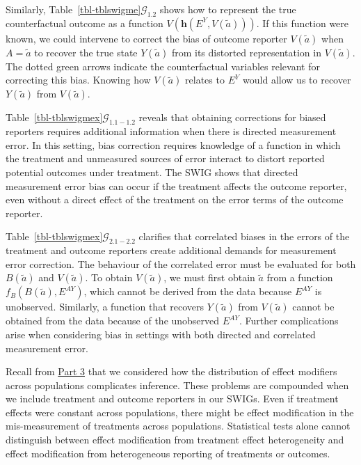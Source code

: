 \documentclass[
  single column]{article}
\begin{document}
Similarly, Table~\ref{tbl-tblswigme}\(\mathcal{G}_{1.2}\) shows how to
represent the true counterfactual outcome as a function
\(V(\mathbf{h}(E^Y, V(\tilde{a})))\). If this function were known, we
could intervene to correct the bias of outcome reporter \(V(\tilde{a})\)
when \(A = \tilde{a}\) to recover the true state \(Y(\tilde{a})\) from
its distorted representation in \(V(\tilde{a})\). The dotted green
arrows indicate the counterfactual variables relevant for correcting
this bias. Knowing how \(V(\tilde{a})\) relates to \(E^Y\) would allow
us to recover \(Y(\tilde{a})\) from \(V(\tilde{a})\).

Table~\ref{tbl-tblswigmex}\(\mathcal{G}_{1.1-1.2}\) reveals that
obtaining corrections for biased reporters requires additional
information when there is directed measurement error. In this setting,
bias correction requires knowledge of a function in which the treatment
and unmeasured sources of error interact to distort reported potential
outcomes under treatment. The SWIG shows that directed measurement error
bias can occur if the treatment affects the outcome reporter, even
without a direct effect of the treatment on the error terms of the
outcome reporter.

Table~\ref{tbl-tblswigmex}\(\mathcal{G}_{2.1-2.2}\) clarifies that
correlated biases in the errors of the treatment and outcome reporters
create additional demands for measurement error correction. The
behaviour of the correlated error must be evaluated for both
\(B(\tilde{a})\) and \(V(\tilde{a})\). To obtain \(V(\tilde{a})\), we
must first obtain \(\tilde{a}\) from a function
\(f_{B}(B(\tilde{a}), E^{AY})\), which cannot be derived from the data
because \(E^{AY}\) is unobserved. Similarly, a function that recovers
\(Y(\tilde{a})\) from \(V(\tilde{a})\) cannot be obtained from the data
because of the unobserved \(E^{AY}\). Further complications arise when
considering bias in settings with both directed and correlated
measurement error.

Recall from \hyperref[id-sec-3]{Part 3} that we considered how the
distribution of effect modifiers across populations complicates
inference. These problems are compounded when we include treatment and
outcome reporters in our SWIGs. Even if treatment effects were constant
across populations, there might be effect modification in the
mis-measurement of treatments across populations. Statistical tests
alone cannot distinguish between effect modification from treatment
effect heterogeneity and effect modification from heterogeneous
reporting of treatments or outcomes.
\end{document}
